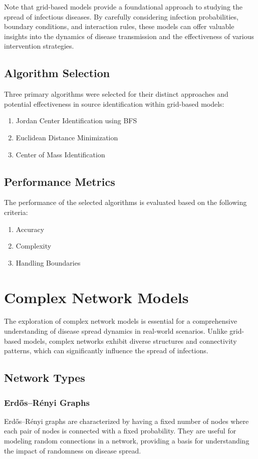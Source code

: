 Note that grid-based models provide a foundational approach to studying the spread of infectious diseases. By carefully considering infection probabilities, boundary conditions, and interaction rules, these models can offer valuable insights into the dynamics of disease transmission and the effectiveness of various intervention strategies.

\subsection{Algorithm Selection}
Three primary algorithms were selected for their distinct approaches and potential effectiveness in source identification within grid-based models:

\begin{enumerate}
    \item Jordan Center Identification using BFS
    \item Euclidean Distance Minimization
    \item Center of Mass Identification
\end{enumerate}

\subsection{Performance Metrics}
The performance of the selected algorithms is evaluated based on the following criteria:
\begin{enumerate}
    \item Accuracy
    \item Complexity
    \item Handling Boundaries
\end{enumerate}

\section{Complex Network Models}
The exploration of complex network models is essential for a comprehensive understanding of disease spread dynamics in real-world scenarios. Unlike grid-based models, complex networks exhibit diverse structures and connectivity patterns, which can significantly influence the spread of infections.

\subsection{Network Types}

\subsubsection{Erdős–Rényi Graphs}
Erdős–Rényi graphs are characterized by having a fixed number of nodes where each pair of nodes is connected with a fixed probability. They are useful for modeling random connections in a network, providing a basis for understanding the impact of randomness on disease spread.


